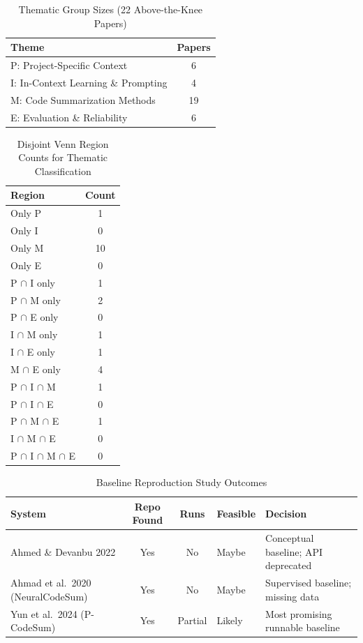 \begin{table}[ht]
\centering
\caption{Thematic Group Sizes (22 Above-the-Knee Papers)}
\label{tab:thematic-groups}
\begin{tabular}{lc}
\toprule
Theme & Papers \\
\midrule
P: Project-Specific Context & 6 \\
I: In-Context Learning \& Prompting & 4 \\
M: Code Summarization Methods & 19 \\
E: Evaluation \& Reliability & 6 \\
\bottomrule
\end{tabular}
\end{table}



\begin{table}[ht]
\centering
\caption{Disjoint Venn Region Counts for Thematic Classification}
\label{tab:venn-counts}
\begin{tabular}{lc}
\toprule
Region & Count \\
\midrule
Only P & 1 \\
Only I & 0 \\
Only M & 10 \\
Only E & 0 \\
P $\cap$ I only & 1 \\
P $\cap$ M only & 2 \\
P $\cap$ E only & 0 \\
I $\cap$ M only & 1 \\
I $\cap$ E only & 1 \\
M $\cap$ E only & 4 \\
P $\cap$ I $\cap$ M & 1 \\
P $\cap$ I $\cap$ E & 0 \\
P $\cap$ M $\cap$ E & 1 \\
I $\cap$ M $\cap$ E & 0 \\
P $\cap$ I $\cap$ M $\cap$ E & 0 \\
\bottomrule
\end{tabular}
\end{table}



\begin{table}[ht]
\centering
\caption{Baseline Reproduction Study Outcomes}
\label{tab:reproduction-study}
\begin{tabular}{lccll}
\toprule
System & Repo Found & Runs & Feasible & Decision \\
\midrule
Ahmed \& Devanbu 2022 & Yes & No & Maybe & Conceptual baseline; API deprecated \\
Ahmad et al.\ 2020 (NeuralCodeSum) & Yes & No & Maybe & Supervised baseline; missing data \\
Yun et al.\ 2024 (P-CodeSum) & Yes & Partial & Likely & Most promising runnable baseline \\
\bottomrule
\end{tabular}
\end{table}
